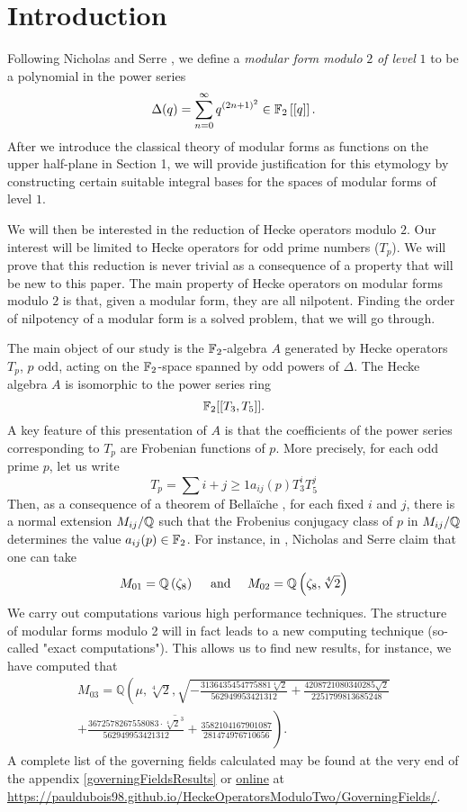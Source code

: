 \setcounter{section}{-1}
\section{Introduction}

Following Nicholas and Serre \cite{OrdreNilpotenceOperateurHecke}, we define a \textit{modular form modulo} $2$ \textit{of level} $1$ to be a polynomial in the power series 
$$
\Delta(q) = \sum_{n = 0}^{\infty}q^{(2n+1)^2} \in \mathbb{F}_2\left[\left[ q \right]\right].
$$
After we introduce the classical theory of modular forms as functions on the upper half-plane in Section 1, we will provide justification for this etymology by constructing certain suitable integral bases for the spaces of modular forms of level $1$.

We will then be interested in the reduction of Hecke operators modulo $2$.
Our interest will be limited to Hecke operators for odd prime numbers ($T_p$).
We will prove that this reduction is never trivial as a consequence of a property that will be new to this paper.
The main property of Hecke operators on modular forms modulo $2$ is that, given a modular form, they are all nilpotent.
Finding the order of nilpotency of a modular form is a solved problem, that we will go through.

The main object of our study is the $\mathbb{F}_2$-algebra $A$ generated by Hecke operators $T_p$, $p$ odd, acting on the $\mathbb{F}_2$-space spanned by odd powers of $\Delta$.
The Hecke algebra $A$ is isomorphic to the power series ring 
$$
\mathbb{F}_2[[T_3, T_5]].
$$
A key feature of this presentation of $A$ is that the coefficients of the power series corresponding to $T_p$ are Frobenian functions of $p$.
More precisely, for each odd prime $p$, let us write 
$$
T_p = \sum{i+j \geq 1} a_{ij}(p)T_3^iT_5^j
$$
Then, as a consequence of a theorem of Bellaïche \cite{bellaiche}, for each fixed $i$ and $j$, there is a normal extension $M_{ij}/\mathbb{Q}$ such that the Frobenius conjugacy class of $p$ in $M_{ij}/\mathbb{Q}$ determines the value $a_{ij}(p) \in \mathbb{F}_2$.
For instance, in \cite{OrdreNilpotenceOperateurHecke}, Nicholas and Serre claim that one can take 
$$
M_{01} = \mathbb{Q}\left( \zeta_8 \right)
\quad \text{ and } \quad 
M_{02} = \mathbb{Q}\left( \zeta_8, \sqrt[4]{2} \right)
$$
We carry out computations various high performance techniques.
The structure of modular forms modulo 2 will in fact leads to a new computing technique (so-called "exact computations").
This allows us to find new results, for instance, we have computed that
\begin{multline*}
	M_{03} = \mathbb{Q}\left(\mu, \sqrt[4]{2}, \sqrt{
		- \frac{3136435454775881 \sqrt[4]{2}}{562949953421312} 
		+ \frac{4208721080340285 \sqrt{2}}{2251799813685248} 
	}\right. \\
	\left. \overline{ 
		+ \frac{3672578267558083 \cdot \sqrt[4]{2}^3}{562949953421312} 
		+ \frac{3582104167901087}{281474976710656}
	}\right).
\end{multline*}
A complete list of the governing fields calculated may be found at the very end of the appendix \ref{governingFieldsResults} or \href{https://pauldubois98.github.io/HeckeOperatorsModuloTwo/GoverningFields/}{online} at \url{https://pauldubois98.github.io/HeckeOperatorsModuloTwo/GoverningFields/}.

